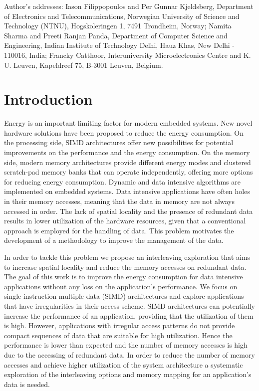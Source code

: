 \documentclass[prodmode,acmtecs]{acmsmall}
\begin{document}
\begin{bottomstuff}
Author's addresses: Iason Filippopoulos {and} Per Gunnar Kjeldsberg, Department of Electronics and Telecommunications, Norwegian University of Science and Technology (NTNU), Hogskoleringen 1, 7491 Trondheim, Norway; Namita Sharma  {and} Preeti Ranjan Panda, Department of Computer Science and Engineering, Indian Institute of Technology Delhi, Hauz Khas, New Delhi - 110016, India; Francky Catthoor, Interuniversity Microelectronics Centre and K. U. Leuven, Kapeldreef 75, B-3001 Leuven, Belgium.
\end{bottomstuff}



\maketitle

\section{Introduction}

Energy is an important limiting factor for modern embedded systems.
New novel hardware solutions have been proposed to reduce the energy consumption.
On the processing side, SIMD architectures offer new possibilities for potential improvements on the performance and the energy consumption.
On the memory side, modern memory architectures provide different energy modes and clustered scratch-pad memory banks that can operate independently, offering more options for reducing energy consumption.
Dynamic and data intensive algorithms are implemented on embedded systems.
Data intensive applications have often holes in their memory accesses, meaning that the data in memory are not always accessed in order.
The lack of spatial locality and the presence of redundant data results in lower utilization of the hardware resources, given that a conventional approach is employed for the handling of data.
This problem motivates the development of a methodology to improve the management of the data.

In order to tackle this problem we propose an interleaving exploration that aims to increase spatial locality and reduce the memory accesses on redundant data.
The goal of this work is to improve the energy consumption for data intensive applications without any loss on the application's performance. 
We focus on single instruction multiple data (SIMD) architectures and explore applications that have irregularities in their access scheme. 
SIMD architectures can potentially increase the performance of an application, providing that the utilization of them is high. 
However, applications with irregular access patterns do not provide compact sequences of data that are suitable for high utilization. 
Hence the performance is lower than expected and the number of memory accesses is high due to the accessing of redundant data. 
In order to reduce the number of memory accesses and achieve higher utilization of the system architecture a systematic exploration of the interleaving options and memory mapping for an application's data is needed. 
\end{document}
